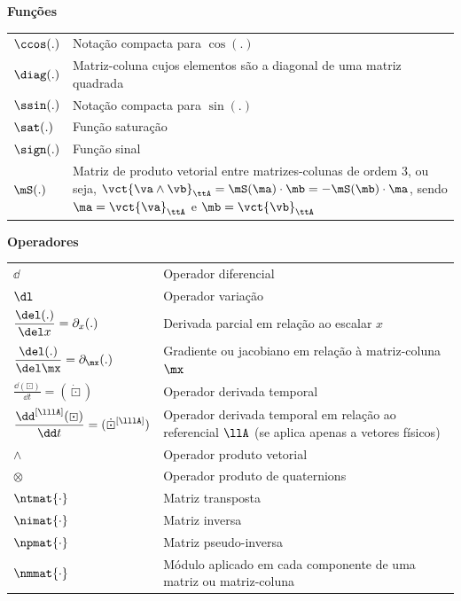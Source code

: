 \documentclass[]{politex}
\begin{document}
\begin{center} \begin{Large} \textbf{Funções} \end{Large} \end{center}
\begin{longtable}{lp{}}
  $\ccos(.)$ & Notação compacta para $\cos(.)$ \\
  $\diag(.)$ & Matriz-coluna cujos elementos são a diagonal de uma matriz quadrada \\
  $\ssin(.)$ & Notação compacta para $\sin(.)$ \\
  $\sat(.)$ & Função saturação \\
  $\sign(.)$ & Função sinal \\
  $\mS(.)$ & Matriz de produto vetorial entre matrizes-colunas de ordem 3, ou seja, $\vct{\va \wedge \vb}_{\ttA} = \mS(\ma) \cdot \mb = -\mS(\mb) \cdot \ma $, sendo $\ma = \vct{\va}_{\ttA}$ e $\mb = \vct{\vb}_{\ttA}$ \\
\end{longtable}
\begin{center} \begin{Large} \textbf{Operadores} \end{Large} \end{center}
\begin{longtable}{lp{}}
  $\dd$ & Operador diferencial \\
  $\dl$ & Operador variação \\
  $\displaystyle\frac{\del (.)}{\del x} = \partial_x (.)$ & Derivada parcial em relação ao escalar $x$ \\
  \addlinespace[0.2cm]
  $\displaystyle\frac{\del (.)}{\del \mx} = \partial_\mx (.)$ & Gradiente ou jacobiano em relação à matriz-coluna $\mx$ \\
  \addlinespace[0.2cm]
  $\displaystyle\frac{\dd (\boxdot) }{\dd t} = (\dot{\boxdot})$ & Operador derivada temporal \\
  \addlinespace[0.2cm]
  $\displaystyle\frac{\dd^{[\lllA]}(\boxdot)}{\dd t} = (\dot{\boxdot}^{[\lllA]})$ & Operador derivada temporal em relação ao referencial $\llA$ (se aplica apenas a vetores físicos) \\
  $\wedge$ & Operador produto vetorial \\
  $\otimes$ & Operador produto de quaternions \\
  $\ntmat{\cdot}$ & Matriz transposta \\
  $\nimat{\cdot}$ & Matriz inversa \\
  $\npmat{\cdot}$ & Matriz pseudo-inversa \\
  $\nmmat{\cdot}$ & Módulo aplicado em cada componente de uma matriz ou matriz-coluna
\end{longtable}
\setcounter{table}{0}
\end{document}
